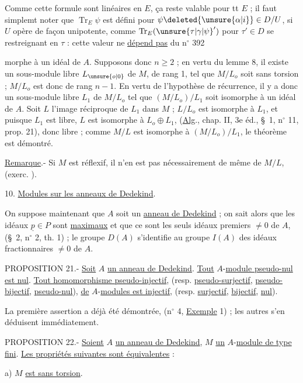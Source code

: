 Comme  cette formule sont linéaires en $E$, ça reste valable pour tt $E$ ; il faut simplemt noter que $\operatorname{Tr}_E\psi$ est défini  pour $\psi\deleted{\unsure{\alpha|i}}\in D/U$, si $U$ opère de façon unipotente, comme $\operatorname{Tr}_E(\unsure{\tau|\gamma|\psi}')$ pour $\tau'\in D$ se restreignant en $\tau$ : cette valeur ne \uline{dépend pas} du
\hfill n$^{\circ}$ 392

morphe à un idéal de $A$. Supposons donc $n\geq 2$ ; en vertu du lemme 8, il existe un sous-module libre $L_{\unsure{o|0}}$ de $M$, de rang 1, tel que $M/L_o$ soit sans torsion ; $M/L_o$ est donc de rang $n-1$. En vertu de l'hypothèse de récurrence, il y a donc un sous-module libre $L_1$ de $M/L_o$ tel que $(M/L_o)/L_1$ soit isomorphe à un idéal de $A$. Soit $L$ l'image réciproque de $L_1$ dans $M$ ; $L/L_o$ est isomorphe à $L_1$, et puisque $L_1$ est libre, $L$ est isomorphe à $L_o\oplus L_1$, (\uline{Alg}., chap. II, 3e éd., \S~1, n$^{\circ}$ 11, prop. 21), donc libre ; comme $M/L$ est isomorphe à $(M/L_o)/L_1$, le théorème est démontré.

\uline{Remarque}.- Si $M$ est réflexif, il n'en est pas nécessairement de même de $M/L$, (exerc. \qquad).

10. \uline{Modules sur les anneaux de Dedekind}.

On suppose maintenant que $A$ soit un \uline{anneau de Dedekind} ; on sait alors que les idéaux $\underline{p}\in P$ sont \uline{maximaux} et que ce sont les seuls idéaux premiers $\ne 0$ de $A$, (\S~2, n$^{\circ}$ 2, th. 1) ; le groupe $D(A)$ s'identifie au groupe $I(A)$ des idéaux fractionnaires $\ne 0$ de $A$.

PROPOSITION 21.- \uline{Soit} $A$ \uline{un anneau de Dedekind}. \uline{Tout} $A$-\uline{module pseudo-nul est nul}. \uline{Tout homomorphisme pseudo-injectif}, (resp. \uline{pseudo-surjectif}, \uline{pseudo-bijectif}, \uline{pseudo-nul}), \uline{de} $A$-\uline{modules est injectif}, (resp. \uline{surjectif}, \uline{bijectif}, \uline{nul}).

La première assertion a déjà été démontrée, (n$^{\circ}$ 4, \uline{Exemple} 1) ; les autres s'en déduisent immédiatement.

PROPOSITION 22.- \uline{Soient} $A$ \uline{un anneau de Dedekind}, $M$ \uline{un} $A$-\uline{module de type fini}. \uline{Les propriétés suivantes sont équivalentes} :

a) $M$ \uline{est sans torsion}.

